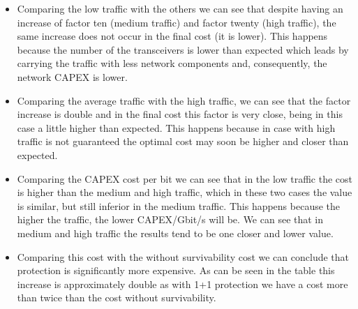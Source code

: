 \begin{itemize}
    \item Comparing the low traffic with the others we can see that despite having an increase of factor ten (medium traffic) and factor twenty (high traffic), the same increase does not occur in the final cost (it is lower). This happens because the number of the transceivers is lower than expected which leads by carrying the traffic with less network components and, consequently, the network CAPEX is lower.
  \item Comparing the average traffic with the high traffic, we can see that the factor increase is double and in the final cost this factor is very close, being in this case a little higher than expected. This happens because in case with high traffic is not guaranteed the optimal cost may soon be higher and closer than expected.
  \item Comparing the CAPEX cost per bit we can see that in the low traffic the cost is higher than the medium and high traffic, which in these two cases the value is similar, but still inferior in the medium traffic. This happens because the higher the traffic, the lower CAPEX/Gbit/s will be. We can see that in medium and high traffic the results tend to be one closer and lower value.
  \item Comparing this cost with the without survivability cost we can conclude that protection is significantly more expensive. As can be seen in the table this increase is approximately double as with 1+1 protection we have a cost more than twice than the cost without survivability.
\end{itemize}
